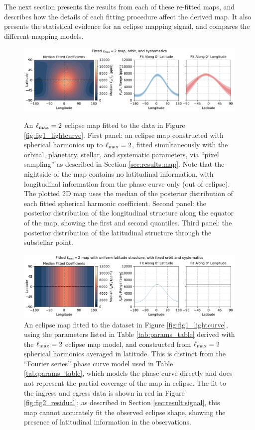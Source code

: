\documentclass[twocolumn]{aastex631}
\begin{document}
The next section presents the results from each of these re-fitted maps, and describes how the details of each fitting procedure affect the derived map. It also presents the statistical evidence for an eclipse mapping signal, and compares the different mapping models.


\begin{figure}
    \centering
    \includegraphics[width=\textwidth]{fig3_map_full.pdf}
    \caption{An $\ell_{\rm max}=2$ eclipse map fitted to the data in Figure \ref{fig:fig1_lightcurve}. First panel: an eclipse map constructed with spherical harmonics up to $\ell_{\rm max}=2$, fitted simultaneously with the orbital, planetary, stellar, and systematic parameters, via ``pixel sampling'' as described in Section \ref{sec:results:map}. Note that the nightside of the map contains no latitudinal information, with longitudinal information from the phase curve only (out of eclipse). The plotted 2D map uses the median of the posterior distribution of each fitted spherical harmonic coefficient. Second panel: the posterior distribution of the longitudinal structure along the equator of the map, showing the first and second quantiles. Third panel: the posterior distribution of the latitudinal structure through the substellar point.}
    \label{fig:fig3_o2_map}
    \centering
    \includegraphics[width=\textwidth]{fig4_o2_flat.pdf}
    \caption{An eclipse map fitted to the dataset in Figure \ref{fig:fig1_lightcurve}, using the parameters listed in Table \ref{tab:params_table} derived with the $\ell_{\rm max}=2$ eclipse map model, and constructed from $\ell_{\rm max}=2$ spherical harmonics averaged in latitude. This is distinct from the ``Fourier series'' phase curve model used in Table \ref{tab:params_table}, which models the phase curve directly and does not represent the partial coverage of the map in eclipse. The fit to the ingress and egress data is shown in red in Figure \ref{fig:fig2_residual}; as described in Section \ref{sec:result:signal}, this map cannot accurately fit the observed eclipse shape, showing the presence of latitudinal information in the observations.}
    \label{fig:fig4_o2_flat_map}
\end{figure}
\end{document}
